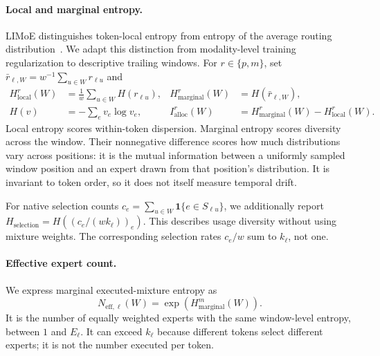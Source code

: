 \paragraph{Local and marginal entropy.}
LIMoE distinguishes token-local entropy from entropy of the average routing
distribution~\cite{newmetrics_mustafa2022}. We adapt this distinction from
modality-level training regularization to descriptive trailing windows.
For $r\in\{p,m\}$, set $\bar r_{\ell,W}=w^{-1}\sum_{u\in W}r_{\ell u}$ and
\begin{align}
 H^{r}_{\mathrm{local}}(W)
   &=\frac{1}{w}\sum_{u\in W}H(r_{\ell u}),
 &H^{r}_{\mathrm{marginal}}(W)&=H(\bar r_{\ell,W}),\nonumber\\
 H(v)&=-\sum_e v_e\log v_e,
 &I^{r}_{\mathrm{alloc}}(W)&=H^{r}_{\mathrm{marginal}}(W)
                           -H^{r}_{\mathrm{local}}(W).
 \label{eq:new-entropies}
\end{align}
Local entropy scores within-token dispersion. Marginal entropy scores diversity
across the window. Their nonnegative difference scores how much distributions
vary across positions: it is the mutual information between a uniformly sampled
window position and an expert drawn from that position's distribution. It is
invariant to token order, so it does not itself measure temporal drift.

For native selection counts $c_e=\sum_{u\in W}\mathbf{1}\{e\in S_{\ell u}\}$,
we additionally report $H_{\mathrm{selection}}=H((c_e/(wk_\ell))_e)$.
This describes usage diversity without using mixture weights. The corresponding
selection rates $c_e/w$ sum to $k_\ell$, not one.

\paragraph{Effective expert count.}
We express marginal executed-mixture entropy as
\begin{equation}
 N_{\mathrm{eff},\ell}(W)=\exp\!\left(H^{m}_{\mathrm{marginal}}(W)\right).
 \label{eq:new-effective-experts}
\end{equation}
It is the number of equally weighted experts with the same window-level entropy,
between $1$ and $E_\ell$. It can exceed $k_\ell$ because different tokens select
different experts; it is not the number executed per token.

